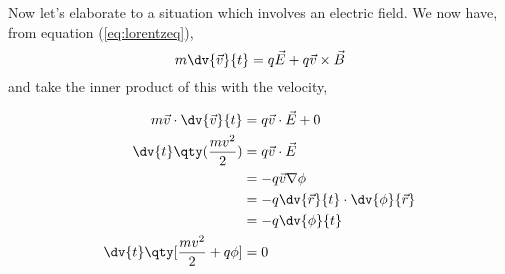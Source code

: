 \documentclass{book}         		                %
\begin{document}
Now let's elaborate to a situation which involves an electric
field. We now have, from equation (\ref{eq:lorentzeq}),
\begin{equation} 
m \dv{\vec{v}}{t} = q\vec{E} + q \vec{v} \times \vec{B}
\end{equation}
and take the inner product of this with the velocity,

\begin{align}
\nonumber m\vec{v}\cdot \dv{\vec{v}}{t}             & = q \vec{v} \cdot \vec{E} + 0                 \\
\nonumber \dv{t} \qty(\frac{mv^2}{2})          & = q \vec{v} \cdot \vec{E}                     \\
\nonumber                                      & = - q \vec{v} \nabla \phi                     \\
\nonumber                                      & = -q \dv{\vec{r}}{t} \cdot \dv{\phi}{\vec{r}} \\
\nonumber                                      & = -q \dv{\phi}{t}                             \\
\nonumber  \dv{t} \qty[ \frac{mv^2}{2}+q \phi] & = 0 
\end{align}
\end{document}
